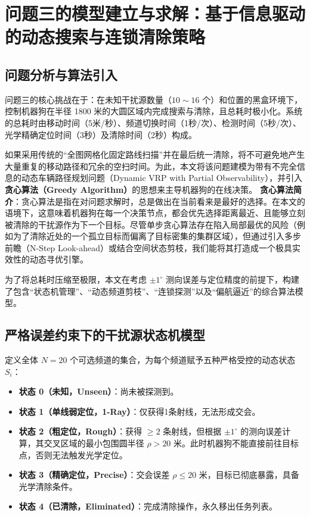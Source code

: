 \documentclass[12pt,a4paper]{article}
\begin{document}
\section{问题三的模型建立与求解：基于信息驱动的动态搜索与连锁清除策略}

\subsection{问题分析与算法引入}
问题三的核心挑战在于：在未知干扰源数量（$10\sim 16$ 个）和位置的黑盒环境下，控制机器狗在半径 1800 米的大圆区域内完成搜索与清除，且总耗时极小化。系统的总耗时由移动时间（5米/秒）、频道切换时间（1秒/次）、检测时间（5秒/次）、光学精确定位时间（3秒）及清除时间（2秒）构成。

如果采用传统的“全图网格化固定路线扫描”并在最后统一清除，将不可避免地产生大量重复的移动路径和冗余的空扫时间。为此，本文将该问题建模为带有不完全信息的动态车辆路径规划问题（Dynamic VRP with Partial Observability），并引入\textbf{贪心算法（Greedy Algorithm）}的思想来主导机器狗的在线决策。
\textbf{贪心算法简介}：贪心算法是指在对问题求解时，总是做出在当前看来是最好的选择。在本文的语境下，这意味着机器狗在每一个决策节点，都会优先选择距离最近、且能够立刻被清除的干扰源作为下一个目标。尽管单步贪心算法存在陷入局部最优的风险（例如为了清除近处的一个孤立目标而偏离了目标密集的集群区域），但通过引入多步前瞻（N-Step Look-ahead）或结合空间状态剪枝，我们能将其打造成一个极具实效性的动态寻优引擎。

为了将总耗时压缩至极限，本文在考虑 $\pm 1^\circ$ 测向误差与定位精度的前提下，构建了包含“状态机管理”、“动态频道剪枝”、“连锁探测”以及“偏航逼近”的综合算法模型。

\subsection{严格误差约束下的干扰源状态机模型}
定义全体 $N=20$ 个可选频道的集合，为每个频道赋予五种严格受控的动态状态 $S_i$：
\begin{itemize}
    \item \textbf{状态 0（未知，Unseen）}：尚未被探测到。
    \item \textbf{状态 1（单线弱定位，1-Ray）}：仅获得1条射线，无法形成交会。
    \item \textbf{状态 2（粗定位，Rough）}：获得 $\ge 2$ 条射线，但根据 $\pm 1^\circ$ 的测向误差计算，其交叉区域的最小包围圆半径 $\rho > 20$ 米。此时机器狗不能直接前往目标点，否则无法触发光学定位。
    \item \textbf{状态 3（精确定位，Precise）}：交会误差 $\rho \le 20$ 米，目标已彻底暴露，具备光学清除条件。
    \item \textbf{状态 4（已清除，Eliminated）}：完成清除操作，永久移出任务列表。
\end{itemize}
\end{document}
